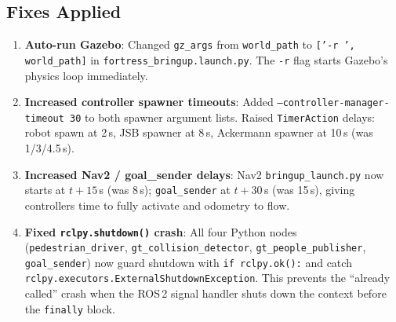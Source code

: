 \documentclass[11pt]{article}
\newcommand{\logentry}[1]{\subsection*{#1}}
\begin{document}
\logentry{Fixes Applied}
\begin{enumerate}
  \item \textbf{Auto-run Gazebo}: Changed \texttt{gz\_args} from
    \texttt{world\_path} to \texttt{['-r ', world\_path]} in
    \texttt{fortress\_bringup.launch.py}.  The \texttt{-r} flag starts
    Gazebo's physics loop immediately.
  \item \textbf{Increased controller spawner timeouts}: Added
    \texttt{--controller-manager-timeout 30} to both spawner argument lists.
    Raised \texttt{TimerAction} delays: robot spawn at 2\,s, JSB spawner at
    8\,s, Ackermann spawner at 10\,s (was 1/3/4.5\,s).
  \item \textbf{Increased Nav2 / goal\_sender delays}: Nav2
    \texttt{bringup\_launch.py} now starts at $t+15$\,s (was 8\,s);
    \texttt{goal\_sender} at $t+30$\,s (was 15\,s), giving controllers time
    to fully activate and odometry to flow.
  \item \textbf{Fixed \texttt{rclpy.shutdown()} crash}: All four Python nodes
    (\texttt{pedestrian\_driver}, \texttt{gt\_collision\_detector},
    \texttt{gt\_people\_publisher}, \texttt{goal\_sender}) now guard shutdown
    with \texttt{if rclpy.ok():} and catch
    \texttt{rclpy.executors.ExternalShutdownException}.  This prevents the
    ``already called'' crash when the ROS\,2 signal handler shuts down the
    context before the \texttt{finally} block.
\end{enumerate}
\end{document}
